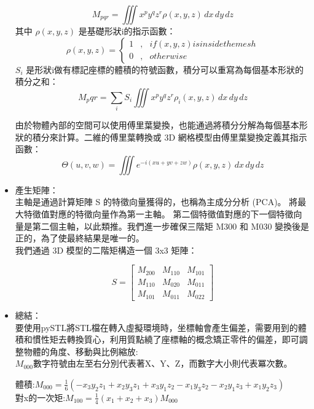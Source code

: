 \begin{itemize}
$$M_{pqr} = \iiint x^{p} y^{q} z^{r} \rho (x,y,z) \,dx\,dy\,dz$$
其中 $\rho (x,y,z)$ 是基礎形狀i的指示函數：\\
\begin{equation}
\label{eq6}
\rho (x,y,z) = \left\{
\begin{aligned}
1 & , & if (x,y,z) is inside the mesh\\
0 & , &              otherwise
\end{aligned}
\right.
\end{equation}
$S_i$ 是形狀i做有標記座標的體積的符號函數，積分可以重寫為每個基本形狀的積分之和：\\
$$M_pqr = \sum_{i} S_i \iiint x^{p} y^{q} z^{r} \rho_i (x,y,z) \,dx\,dy\,dz$$

由於物體內部的空間可以使用傅里葉變換，也能通過將積分分解為每個基本形狀的積分來計算。二維的傅里葉轉換或 3D 網格模型由傅里葉變換定義其指示函數：\\

$$ \Theta (u,v,w) = \iiint e^{-i (xu+yv+zw)} \rho (x,y,z) \,dx\,dy\,dz $$

\item 產生矩陣：\\
主軸是通過計算矩陣 S 的特徵向量獲得的，也稱為主成分分析 (PCA)。 將最大特徵值對應的特徵向量作為第一主軸。 第二個特徵值對應的下一個特徵向量是第二個主軸，以此類推。我們進一步確保三階矩 M300 和 M030 變換後是正的，為了使最終結果是唯一的。\\

我們通過 3D 模型的二階矩構造一個 3x3 矩陣：

\[ 
S=\begin{bmatrix} 
M_{200} & M_{110} & M_{101} \\
M_{110} & M_{020} & M_{011} \\
M_{101} & M_{011} & M_{022} 
\end{bmatrix}
\]

\item 總結：\\
要使用pySTL將STL檔在轉入虛擬環境時，坐標軸會產生偏差，需要用到的體積和慣性矩去轉換質心，利用質點繞了座標軸的概念矯正零件的偏差，即可調整物體的角度、移動與比例縮放:\\

$M_{000}$數字符號由左至右分別代表著X、Y、Z，而數字大小則代表冪次數。


體積:$M_{000} = \frac{1}{6}(-x_3 y_2 z_1 + x_2 y_3 z_1 + x_3 y_1 z_2 - x_1 y_3 z_2 - x_2 y_1 z_3 + x_1 y_2 z_3) $\\

對x的一次矩:$M_{100} = \frac{1}{4}(x_1 + x_2 + x_3) M_{000} $\\


\end{itemize}
